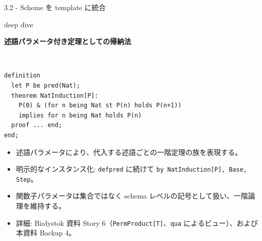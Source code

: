 \documentclass[dvipdfmx,aspectratio=169,11pt]{beamer}
\newcommand{\statusbadge}[2]{\colorbox{#1}{\textcolor{white}{\strut\scriptsize\sffamily\bfseries #2}}}
\newcommand{\badgeSpec}{\statusbadge{green!35!black}{specification example}}
\newcommand{\deepdivetag}{\hfill\colorbox{black!15}{\textcolor{black!65}{\strut\scriptsize\sffamily deep dive}}}
\begin{document}
\begin{frame}[fragile,t]{3.2 - Scheme を template に統合\deepdivetag}
\smallskip
\textbf{述語パラメータ付き定理としての帰納法}~\badgeSpec
\begin{lstlisting}[language={mizar},basicstyle=\ttfamily\small]
definition
  let P be pred(Nat);
  theorem NatInduction[P]:
    P(0) & (for n being Nat st P(n) holds P(n+1))
    implies for n being Nat holds P(n)
  proof ... end;
end;
\end{lstlisting}
\begin{itemize}
\setlength{\itemsep}{1pt}
\setlength{\parsep}{0pt}
\setlength{\parskip}{0pt}
\item 述語パラメータにより、代入する述語ごとの一階定理の族を表現する。
\item 明示的なインスタンス化: \texttt{defpred} に続けて \texttt{by NatInduction[P], Base, Step}。
\item 関数子パラメータは集合ではなく schema レベルの記号として扱い、一階論理を維持する。
\item 詳細: Bia\l{}ystok 資料 Story 6（\texttt{PermProduct[T]}、\texttt{qua} によるビュー）、および本資料 Backup 4。
\end{itemize}
\end{frame}
\end{document}
